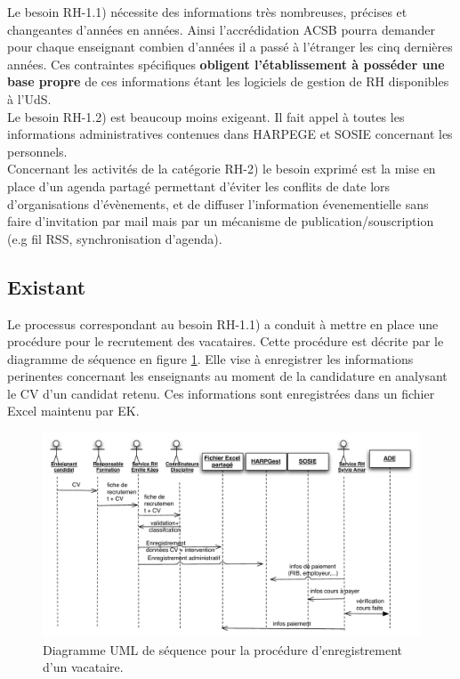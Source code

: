 \documentclass{book}
\begin{document}
\bigskip

Le besoin RH-1.1) nécessite des informations très nombreuses, précises
et changeantes d'années en années. Ainsi l'accrédidation ACSB 
pourra demander pour chaque enseignant combien d'années il a passé
à l'étranger les cinq dernières années.
Ces contraintes spécifiques \textbf{obligent l'établissement à 
posséder une base propre} de ces informations étant les logiciels
de gestion de RH disponibles à l'UdS.\\

Le besoin RH-1.2) est beaucoup moins exigeant. Il fait appel à toutes
les informations administratives contenues dans HARPEGE et SOSIE
concernant les personnels.\\


Concernant les activités de la catégorie RH-2) le besoin exprimé 
est la mise en place d'un agenda partagé permettant d'éviter
les conflits de date lors d'organisations d'évènements, et de 
diffuser l'information évenementielle sans faire d'invitation
par mail mais par un mécanisme de publication/souscription
(e.g fil RSS, synchronisation d'agenda).  



\subsection{Existant}

Le processus correspondant au besoin RH-1.1) a conduit à mettre en
place une procédure pour le recrutement des vacataires. Cette procédure
est décrite par le diagramme de séquence en figure \ref{fg:rh_seq_vacataires}.
Elle vise à enregistrer les informations perinentes concernant les enseignants
au moment de la candidature en analysant le CV d'un candidat retenu. Ces
informations sont enregistrées dans un fichier Excel maintenu par EK.

\begin{figure}[hbt]
\begin{center}
\includegraphics[width=\linewidth]{figs/rh_seq_vacataires.pdf}
\end{center}
\caption{Diagramme UML de séquence pour la procédure d'enregistrement d'un vacataire.}
\label{fg:rh_seq_vacataires}
\end{figure}
\end{document}
